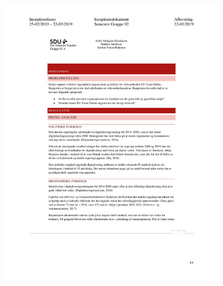 \begin{figure}[hb]
  \includegraphics[scale = 0.33]{./PNG/Inceptions/Gruppe 02 + InceptionsDokument-48.jpg} 
\end{figure}

